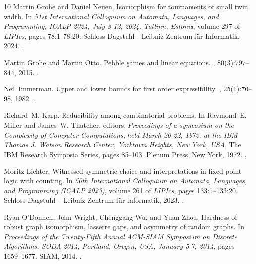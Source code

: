 \documentclass[10pt,a4paper]{article}
\begin{document}
\begin{thebibliography}{10}
Martin Grohe and Daniel Neuen.
\newblock Isomorphism for tournaments of small twin width.
\newblock In {\em 51st International Colloquium on Automata, Languages, and
  Programming, {ICALP} 2024, July 8-12, 2024, Tallinn, Estonia}, volume 297 of
  {\em LIPIcs}, pages 78:1--78:20. Schloss Dagstuhl - Leibniz-Zentrum f{\"{u}}r
  Informatik, 2024.
\newblock \href {https://doi.org/10.4230/LIPICS.ICALP.2024.78}
  {}.

Martin Grohe and Martin Otto.
\newblock Pebble games and linear equations.
, 80(3):797--844, 2015.
\newblock \href {https://doi.org/10.1017/JSL.2015.28}
  {}.

Neil Immerman.
\newblock Upper and lower bounds for first order expressibility.
, 25(1):76--98, 1982.
\newblock \href {https://doi.org/10.1016/0022-0000(82)90011-3}
  {}.

Richard~M. Karp.
\newblock Reducibility among combinatorial problems.
\newblock In Raymond~E. Miller and James~W. Thatcher, editors, {\em Proceedings
  of a symposium on the Complexity of Computer Computations, held March 20-22,
  1972, at the {IBM} Thomas J. Watson Research Center, Yorktown Heights, New
  York, {USA}}, The {IBM} Research Symposia Series, pages 85--103. Plenum
  Press, New York, 1972.
\newblock \href {https://doi.org/10.1007/978-1-4684-2001-2\_9}
  {}.

Moritz Lichter.
\newblock Witnessed symmetric choice and interpretations in fixed-point logic
  with counting.
\newblock In {\em 50th International Colloquium on Automata, Languages, and
  Programming (ICALP 2023)}, volume 261 of {\em LIPIcs}, pages 133:1--133:20.
  Schloss Dagstuhl -- Leibniz-Zentrum f{\"u}r Informatik, 2023.
\newblock \href {https://doi.org/10.4230/LIPIcs.ICALP.2023.133}
  {}.

Ryan O'Donnell, John Wright, Chenggang Wu, and Yuan Zhou.
\newblock Hardness of robust graph isomorphism, lasserre gaps, and asymmetry of
  random graphs.
\newblock In {\em Proceedings of the Twenty-Fifth Annual {ACM-SIAM} Symposium
  on Discrete Algorithms, {SODA} 2014, Portland, Oregon, USA, January 5-7,
  2014}, pages 1659--1677. {SIAM}, 2014.
\newblock \href {https://doi.org/10.1137/1.9781611973402.120}
  {}.


\end{thebibliography}
\end{document}
